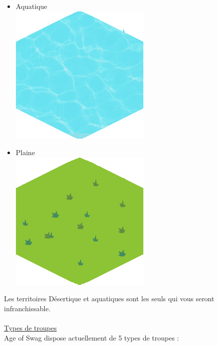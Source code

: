 \begin{itemize}
    \item Aquatique\\
    \includegraphics[scale=0.31]{ground/wa.png}\\
    \item Plaine\\
    \includegraphics[scale=0.31]{ground/pl.png}\\
  \end{itemize}
    Les territoires Désertique et aquatiques sont les seuls qui vous seront infranchissable.\\
  \\
  \underline{Types de troupes}\\
  Age of Swag dispose actuellement de 5 types de troupes :\\
